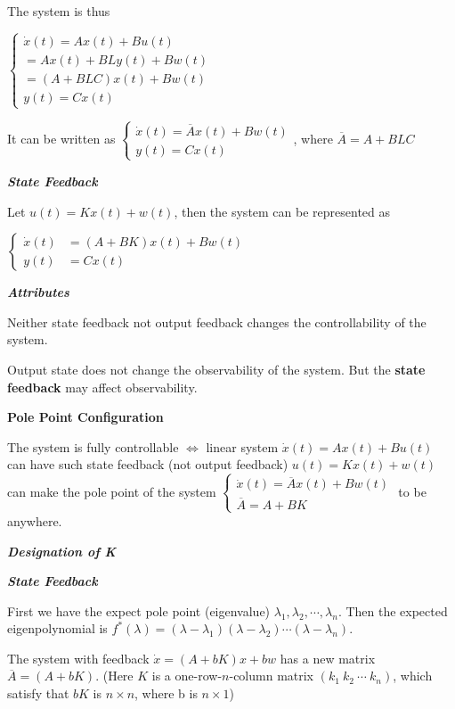 \documentclass{article}
\newcommand{\bigtitle}[1]{
	\noindent
	\textbf{#1}
}
\newcommand{\smalltitle}[1]{
	\noindent
	\textbf{\textit{#1}}
}
\begin{document}
\begin{spacing}{1.2}
The system is thus

$\left\{ \begin{array}{l}{\dot{x}(t)=A x(t)+B u(t)} \\ {=A x(t)+B L y(t)+B w(t)} \\ {=(A+B L C) x(t)+B w(t)} \\ {y(t)=C x(t)}\end{array}\right.$

It can be written as $\left\{\begin{array}{c}{\dot{x}(t)=\overline{A} x(t)+B w(t)} \\ {y(t)=C x(t)}\end{array}\right.$, where $\overline{A}=A+B L C$


\smalltitle{State Feedback}

Let $u(t)=K x(t)+w(t)$, then the system can be represented as

$\left\{ \begin{array}{ll} \dot{x}(t) &=(A+B K) x(t)+B w(t) \\ y(t) &=C x(t) \end{array} \right.$

\smalltitle{Attributes}

Neither state feedback not output feedback changes the controllability of the system.

Output state does not change the observability of the system. But the \textbf{state feedback} may affect observability.

\bigtitle{Pole Point Configuration}

The system is fully controllable $\Leftrightarrow$ linear system $\dot{x}(t)=A x(t)+B u(t)$ can have such state feedback (not output feedback) $u(t)=K x(t)+w(t)$ can make the pole point of the system $\left\{\begin{array}{l}{\dot{x}(t)=\overline{A} x(t)+B w(t)} \\ {\overline{A}=A+B K}\end{array} \right.$ to be anywhere.

\smalltitle{Designation of K}

\smalltitle{State Feedback}

First we have the expect pole point (eigenvalue) $\lambda_1, \lambda_{2}, \cdots, \lambda_{n}$.
Then the expected eigenpolynomial is $f^*(\lambda) = (\lambda - \lambda_{1})(\lambda - \lambda_{2}) \cdots (\lambda - \lambda_{n})$.

The system with feedback $\dot{x}=(A+bK) x+b w$ has a new matrix $\overline{A} = (A+bK)$. (Here $K$ is a one-row-$n$-column matrix $(k_1\ k_2\ \cdots \ k_n)$, which satisfy that $bK$ is $n\times n$, where b is $n \times 1 $)


\end{spacing}
\end{document}
